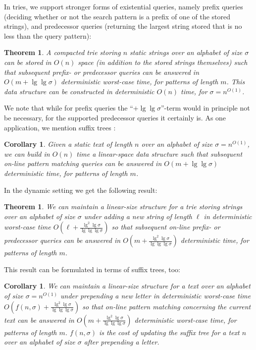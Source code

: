 \documentclass[11pt,onecolumn,final]{article} \usepackage{a4}
\theoremstyle{plain}
\newtheorem{theorem}[definition]{Theorem}
\newtheorem{corollary}[definition]{Corollary}
\theoremstyle{remark}
\begin{document}
In tries, we support stronger forms of existential queries, namely prefix queries (deciding whether or not the search pattern is a prefix of one of the stored strings), and predecessor queries (returning the largest string stored that is no less than the query pattern):

\begin{theorem}
  \label{thm:main}
  A compacted trie storing $n$ static strings over an alphabet of size $\sigma$ can be stored in $O(n)$ space (in addition to the stored strings themselves) such that subsequent prefix- or predecessor queries can be answered in $O(m+\lg\lg\sigma)$ deterministic worst-case time, for patterns of length $m$. This data structure can be constructed in deterministic $O(n)$ time, for $\sigma=n^{O(1)}$.
\end{theorem}

We note that while for prefix queries the ``$+\lg\lg\sigma$''-term would in principle not be necessary, for the supported predecessor queries it certainly is. As one application, we mention suffix trees \cite{weiner73linear}:

\begin{corollary}
  \label{cor:main}
  Given a static text of length $n$ over an alphabet of size $\sigma=n^{O(1)}$, we can build in $O(n)$ time a linear-space data structure such that subsequent on-line pattern matching queries can be answered in $O(m+\lg\lg \sigma)$ deterministic time, for patterns of length $m$.
\end{corollary}

In the dynamic setting we get the following result:

\begin{theorem}
\label{thm:main2}
  We can maintain a linear-size structure for a trie storing strings over an alphabet of size $\sigma$ under adding a new string of length $\ell$ in deterministic worst-case time $O(\ell+\frac{\lg^{2}\lg\sigma}{\lg\lg\lg\sigma})$ so that subsequent on-line prefix- or predecessor queries can be answered in $O(m+\frac{\lg^{2}\lg\sigma}{\lg\lg\lg\sigma})$ deterministic time, for patterns of length $m$.
\end{theorem}

This result can be formulated in terms of suffix trees, too:

\begin{corollary}
  \label{cor:main2}
  We can maintain a linear-size structure for a text over an alphabet of size $\sigma=n^{O(1)}$ under prepending a new letter in deterministic worst-case time $O(f(n,\sigma)+\frac{\lg^{2}\lg\sigma}{\lg\lg\lg\sigma})$ so that on-line pattern matching concerning the current text can be answered in $O(m+\frac{\lg^{2}\lg\sigma}{\lg\lg\lg\sigma})$ deterministic worst-case time, for patterns of length $m$. $f(n,\sigma)$ is the cost of updating the suffix tree for a text $n$ over an alphabet of size $\sigma$ after prepending a letter.
\end{corollary}
\end{document}
